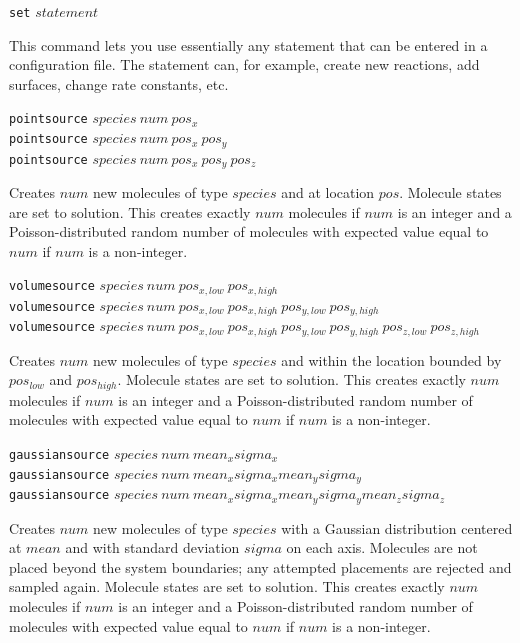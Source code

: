 \documentclass {scrbook}
\newcommand {\ttt} {\texttt}
\begin{document}
\begin{description}

\item{\ttt{set} $statement$}

This command lets you use essentially any statement that can be entered in a configuration file. The statement can, for example, create new reactions, add surfaces, change rate constants, etc.

\item{\ttt{pointsource} $species\ num\ pos_x$\\
\ttt{pointsource} $species\ num\ pos_x\ pos_y$\\
\ttt{pointsource} $species\ num\ pos_x\ pos_y\ pos_z$}

Creates $num$ new molecules of type $species$ and at location $pos$. Molecule states are set to solution. This creates exactly $num$ molecules if $num$ is an integer and a Poisson-distributed random number of molecules with expected value equal to $num$ if $num$ is a non-integer.

\item{\ttt{volumesource} $species\ num\ pos_{x,low}\ pos_{x,high}$\\
\ttt{volumesource} $species\ num\ pos_{x,low}\ pos_{x,high}\ pos_{y,low}\ pos_{y,high}$\\
\ttt{volumesource} $species\ num\ pos_{x,low}\ pos_{x,high}\ pos_{y,low}\ pos_{y,high}\ pos_{z,low}\ pos_{z,high}$}

Creates $num$ new molecules of type $species$ and within the location bounded by $pos_{low}$ and $pos_{high}$. Molecule states are set to solution. This creates exactly $num$ molecules if $num$ is an integer and a Poisson-distributed random number of molecules with expected value equal to $num$ if $num$ is a non-integer.

\item{\ttt{gaussiansource} $species\ num\ mean_x sigma_x$\\
\ttt{gaussiansource} $species\ num\ mean_x sigma_x mean_y sigma_y$\\
\ttt{gaussiansource} $species\ num\ mean_x sigma_x mean_y sigma_y mean_z sigma_z$}

Creates $num$ new molecules of type $species$ with a Gaussian distribution centered at $mean$ and with standard deviation $sigma$ on each axis. Molecules are not placed beyond the system boundaries; any attempted placements are rejected and sampled again. Molecule states are set to solution. This creates exactly $num$ molecules if $num$ is an integer and a Poisson-distributed random number of molecules with expected value equal to $num$ if $num$ is a non-integer.


\end{description}
\end{document}
